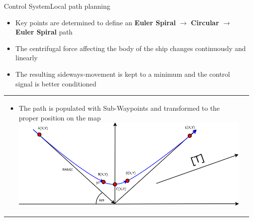 \begin{frame}{Control System}{Local path planning}
		\begin{itemize}
			\item Key points are determined to define an \textbf{Euler Spiral} $\rightarrow$ \textbf{Circular} $\rightarrow$ \textbf{Euler Spiral} path
			\item The centrifugal force affecting the body of the ship changes continuously and linearly
			\item The resulting sideways-movement is kept to a minimum and the control signal is better conditioned
		\end{itemize}
			\begin{tabular}{l l}
			\hspace{-3.1mm}
				\begin{minipage}{0.6\textwidth}
					\begin{itemize}
						\vspace{-2.5mm}
						\item The path is populated with Sub-Waypoints and transformed to the proper position on the map 
						\includegraphics[width = \textwidth]{control/img/positioning1}
					\end{itemize}
				\end{minipage}
			&
				\begin{minipage}{0.3\textwidth}

\end{minipage}
\end{tabular}
\end{frame}
